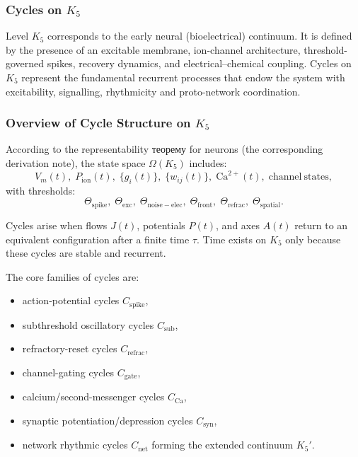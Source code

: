 
\subsubsection{Cycles on \texorpdfstring{$K_5$}{K_5}}
\label{sec:cycles-k5}

Level $K_5$ corresponds to the early neural (bioelectrical) continuum.
It is defined by the presence of an excitable membrane, ion-channel
architecture, threshold-governed spikes, recovery dynamics, and
electrical–chemical coupling.  
Cycles on $K_5$ represent the fundamental recurrent processes that endow
the system with excitability, signalling, rhythmicity and proto-network
coordination.

\subsubsection{Overview of Cycle Structure on \texorpdfstring{$K_5$}{K_5}}

According to the representability теорему for neurons (the corresponding derivation note),
the state space $\Omega(K_5)$ includes:
\[
  V_m(t),\;
  P_{\mathrm{ion}}(t),\;
  \{g_i(t)\},\;
  \{w_{ij}(t)\},\;
  \mathrm{Ca}^{2+}(t),\;
  \mathrm{channel\ states},
\]
with thresholds:
\[
  \Theta_{\mathrm{spike}},\;
  \Theta_{\mathrm{exc}},\;
  \Theta_{\mathrm{noise-elec}},\;
  \Theta_{\mathrm{front}},\;
  \Theta_{\mathrm{refrac}},\;
  \Theta_{\mathrm{spatial}}.
\]

Cycles arise when flows $J(t)$, potentials $P(t)$, and axes $A(t)$
return to an equivalent configuration after a finite time $\tau$.
Time exists on $K_5$ only because these cycles are stable and recurrent.

The core families of cycles are:

\begin{itemize}
  \item action-potential cycles $C_{\mathrm{spike}}$,
  \item subthreshold oscillatory cycles $C_{\mathrm{sub}}$,
  \item refractory-reset cycles $C_{\mathrm{refrac}}$,
  \item channel-gating cycles $C_{\mathrm{gate}}$,
  \item calcium/second-messenger cycles $C_{\mathrm{Ca}}$,
  \item synaptic potentiation/depression cycles $C_{\mathrm{syn}}$,
  \item network rhythmic cycles $C_{\mathrm{net}}$ forming the extended continuum $K_5'$.
\end{itemize}


